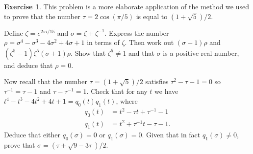 \documentclass{amsart}
\renewcommand{\:}{\colon}
\newcommand{\zt}        {\zeta}
\newcommand{\sg}        {\sigma}
\theoremstyle{definition}
\newtheorem{exercise}{Exercise}
\begin{document}
\begin{exercise}
 This problem is a more elaborate application of the method we used to
 prove that the number $\tau=2\cos(\pi/5)$ is equal to
 $(1+\sqrt{5})/2$.  

 Define $\zt=e^{2\pi i/15}$ and $\sg=\zt+\zt^{-1}$.  Express the number
 $\rho=\sg^4-\sg^3-4\sg^2+4\sg+1$ in terms of $\zt$.  Then work out
 $(\sg+1)\rho$ and $(\zt^5-1)\zt^5(\sg+1)\rho$.  Show that
 $\zt^5\neq 1$  and that $\sg$ is a positive real number, and deduce
 that $\rho=0$.

 Now recall that the number $\tau=(1+\sqrt{5})/2$ satisfies
 $\tau^2-\tau-1=0$ so $\tau^{-1}=\tau-1$ and $\tau-\tau^{-1}=1$.
 Check that for any $t$ we have 
 $t^4-t^3-4t^2+4t+1=q_0(t)q_1(t)$, where
 \begin{align*}
  q_0(t) &= t^2-\tau t+\tau^{-1}-1 \\
  q_1(t) &= t^2+\tau^{-1}t-\tau-1.
 \end{align*}
 Deduce that either $q_0(\sg)=0$ or $q_1(\sg)=0$.  Given that in fact
 $q_1(\sg)\neq 0$, prove that $\sg=(\tau+\sqrt{9-3\tau})/2$.
\end{exercise}
\end{document}
